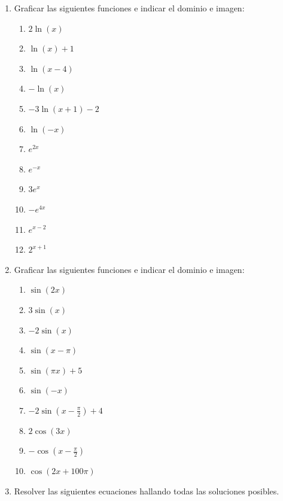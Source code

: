 \documentclass[a4paper]{article}
\newcommand{\exercise}{\item}
\begin{document}
\begin{enumerate}
	\begin{enumerate} [label=(\alph*)]
		\item $2^x=10$
		\item $2\ln(x)=4$
		\item $e^{x^2+1}=\displaystyle{\frac{1}{e^2}}$
		\item $\ln(x)+\ln(x^2)=-\ln(6)$
	\end{enumerate}
	\exercise Graficar las siguientes funciones e indicar el dominio e imagen:
	\begin{enumerate} [label=(\alph*)]
		\item $2\ln(x)$
		\item $\ln(x)+1$
		\item $\ln(x-4)$
		\item $-\ln(x)$
		\item $-3\ln(x+1)-2$
		\item $\ln(-x)$
		\item $e^{2x}$
		\item $e^{-x}$
		\item $3e^{x}$
		\item $-e^{4x}$
		\item $e^{x-2}$
		\item $2^{x+1}$
	\end{enumerate}
	\exercise Graficar las siguientes funciones e indicar el dominio e imagen:
	\begin{enumerate} [label=(\alph*)]
		\item $\sin(2x)$
		\item $3\sin(x)$
		\item $-2\sin(x)$
		\item $\sin(x-\pi)$
		\item $\sin(\pi x)+5$
		\item $\sin(-x)$
		\item $-2\sin\left(x-\frac{\pi}{2}\right)+4$
		\item $2\cos(3x)$
		\item $-\cos\left(x-\frac{\pi}{2}\right)$
		\item $\cos(2x+100\pi)$
	\end{enumerate}
	\exercise Resolver las siguientes ecuaciones hallando todas las soluciones posibles.

\end{enumerate}
\end{document}
